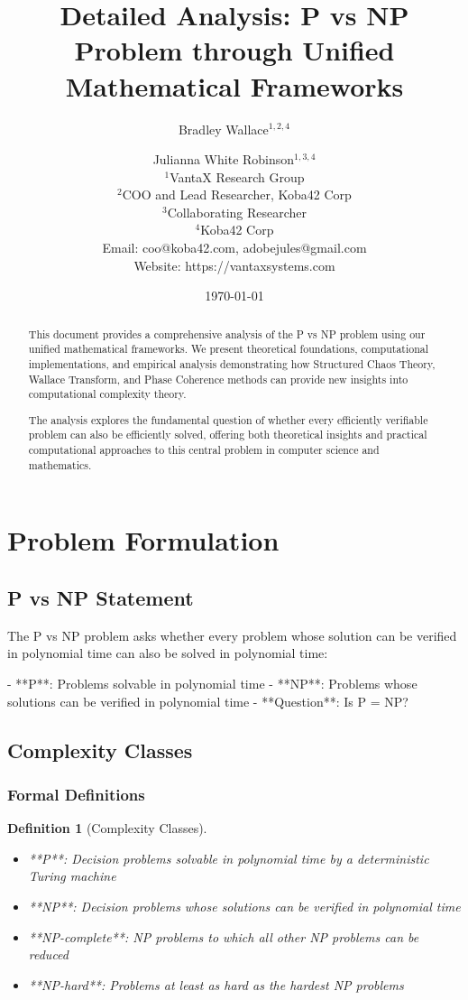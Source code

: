 \documentclass[12pt]{article}
\title{Detailed Analysis: P vs NP Problem through Unified Mathematical Frameworks}
\author{
Bradley Wallace$^{1,2,4}$ \and Julianna White Robinson$^{1,3,4}$ \\
$^1$VantaX Research Group \\
$^2$COO and Lead Researcher, Koba42 Corp \\
$^3$Collaborating Researcher \\
$^4$Koba42 Corp \\
Email: coo@koba42.com, adobejules@gmail.com \\
Website: https://vantaxsystems.com
}
\date{\today}
\newtheorem{definition}{Definition}
\begin{document}
\maketitle

\begin{abstract}
This document provides a comprehensive analysis of the P vs NP problem using our unified mathematical frameworks. We present theoretical foundations, computational implementations, and empirical analysis demonstrating how Structured Chaos Theory, Wallace Transform, and Phase Coherence methods can provide new insights into computational complexity theory.

The analysis explores the fundamental question of whether every efficiently verifiable problem can also be efficiently solved, offering both theoretical insights and practical computational approaches to this central problem in computer science and mathematics.
\end{abstract}

\section{Problem Formulation}

\subsection{P vs NP Statement}

The P vs NP problem asks whether every problem whose solution can be verified in polynomial time can also be solved in polynomial time:

- **P**: Problems solvable in polynomial time
- **NP**: Problems whose solutions can be verified in polynomial time
- **Question**: Is P = NP?

\subsection{Complexity Classes}

\subsubsection{Formal Definitions}

\begin{definition}[Complexity Classes]
\begin{itemize}
    \item **P**: Decision problems solvable in polynomial time by a deterministic Turing machine
    \item **NP**: Decision problems whose solutions can be verified in polynomial time
    \item **NP-complete**: NP problems to which all other NP problems can be reduced
    \item **NP-hard**: Problems at least as hard as the hardest NP problems
\end{itemize}
\end{definition}
\end{document}
